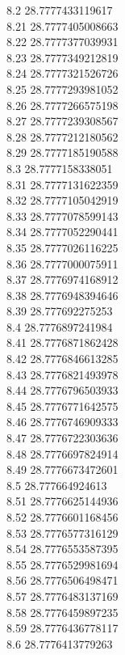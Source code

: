 {8.2	28.7777433119617\\
8.21	28.7777405008663\\
8.22	28.7777377039931\\
8.23	28.7777349212819\\
8.24	28.7777321526726\\
8.25	28.7777293981052\\
8.26	28.7777266575198\\
8.27	28.7777239308567\\
8.28	28.7777212180562\\
8.29	28.7777185190588\\
8.3	28.7777158338051\\
8.31	28.7777131622359\\
8.32	28.7777105042919\\
8.33	28.7777078599143\\
8.34	28.7777052290441\\
8.35	28.7777026116225\\
8.36	28.7777000075911\\
8.37	28.7776974168912\\
8.38	28.7776948394646\\
8.39	28.777692275253\\
8.4	28.7776897241984\\
8.41	28.7776871862428\\
8.42	28.7776846613285\\
8.43	28.7776821493978\\
8.44	28.7776796503933\\
8.45	28.7776771642575\\
8.46	28.7776746909333\\
8.47	28.7776722303636\\
8.48	28.7776697824914\\
8.49	28.7776673472601\\
8.5	28.777664924613\\
8.51	28.7776625144936\\
8.52	28.7776601168456\\
8.53	28.7776577316129\\
8.54	28.7776553587395\\
8.55	28.7776529981694\\
8.56	28.7776506498471\\
8.57	28.7776483137169\\
8.58	28.7776459897235\\
8.59	28.7776436778117\\
8.6	28.7776413779263\\
}
